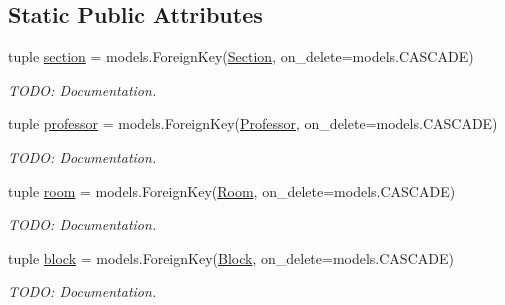 \subsection*{Static Public Attributes}
\begin{DoxyCompactItemize}
\item 
\hypertarget{classscheduler_1_1models_1_1_hunk_a24e5838d535817f4d0cb27f8fb6edd36}{tuple \hyperlink{classscheduler_1_1models_1_1_hunk_a24e5838d535817f4d0cb27f8fb6edd36}{section} = models.\-Foreign\-Key(\hyperlink{classscheduler_1_1models_1_1_section}{Section}, on\-\_\-delete=models.\-C\-A\-S\-C\-A\-D\-E)}\label{classscheduler_1_1models_1_1_hunk_a24e5838d535817f4d0cb27f8fb6edd36}

\begin{DoxyCompactList}\small\item\em T\-O\-D\-O\-: Documentation. \end{DoxyCompactList}\item 
\hypertarget{classscheduler_1_1models_1_1_hunk_aa01e29b62d649ce7cd0ccc0e35b51747}{tuple \hyperlink{classscheduler_1_1models_1_1_hunk_aa01e29b62d649ce7cd0ccc0e35b51747}{professor} = models.\-Foreign\-Key(\hyperlink{classscheduler_1_1models_1_1_professor}{Professor}, on\-\_\-delete=models.\-C\-A\-S\-C\-A\-D\-E)}\label{classscheduler_1_1models_1_1_hunk_aa01e29b62d649ce7cd0ccc0e35b51747}

\begin{DoxyCompactList}\small\item\em T\-O\-D\-O\-: Documentation. \end{DoxyCompactList}\item 
\hypertarget{classscheduler_1_1models_1_1_hunk_ac50c8aaab3e58e9bf1ff953f4246f21a}{tuple \hyperlink{classscheduler_1_1models_1_1_hunk_ac50c8aaab3e58e9bf1ff953f4246f21a}{room} = models.\-Foreign\-Key(\hyperlink{classscheduler_1_1models_1_1_room}{Room}, on\-\_\-delete=models.\-C\-A\-S\-C\-A\-D\-E)}\label{classscheduler_1_1models_1_1_hunk_ac50c8aaab3e58e9bf1ff953f4246f21a}

\begin{DoxyCompactList}\small\item\em T\-O\-D\-O\-: Documentation. \end{DoxyCompactList}\item 
\hypertarget{classscheduler_1_1models_1_1_hunk_ab6e2df449de158fcf00218f6f2e63832}{tuple \hyperlink{classscheduler_1_1models_1_1_hunk_ab6e2df449de158fcf00218f6f2e63832}{block} = models.\-Foreign\-Key(\hyperlink{classscheduler_1_1models_1_1_block}{Block}, on\-\_\-delete=models.\-C\-A\-S\-C\-A\-D\-E)}\label{classscheduler_1_1models_1_1_hunk_ab6e2df449de158fcf00218f6f2e63832}

\begin{DoxyCompactList}\small\item\em T\-O\-D\-O\-: Documentation. \end{DoxyCompactList}\end{DoxyCompactItemize}



